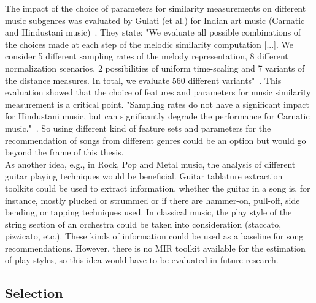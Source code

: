 The impact of the choice of parameters for similarity measurements on different music subgenres was evaluated by Gulati (et al.) for Indian art music (Carnatic and Hindustani music)~\cite{mussim1}. They state: "We evaluate all possible combinations of the choices made at each step of the melodic similarity computation [...].  We consider 5 different sampling rates of the melody representation, 8 different normalization scenarios, 2 possibilities of uniform time-scaling and 7 variants of the distance measures.  In total, we evaluate 560 different variants"~\cite[p. 3]{mussim1}. This evaluation showed that the choice of features and parameters for music similarity measurement is a critical point. "Sampling rates do not have a significant impact for Hindustani music, but can significantly degrade the performance for Carnatic music."~\cite[p. 3]{mussim1}. So using different kind of feature sets and parameters for the recommendation of songs from different genres could be an option but would go beyond the frame of this thesis.\\
As another idea, e.g., in Rock, Pop and Metal music, the analysis of different guitar playing techniques would be beneficial. Guitar tablature extraction~\cite{guitext1} toolkits could be used to extract information, whether the guitar in a song is, for instance, mostly plucked or strummed or if there are hammer-on, pull-off, side bending, or tapping techniques used. In classical music, the play style of the string section of an orchestra could be taken into consideration (staccato, pizzicato, etc.). These kinds of information could be used as a baseline for song recommendations. 
However, there is no MIR toolkit available for the estimation of play styles, so this idea would have to be evaluated in future research.

\subsection{Selection}


